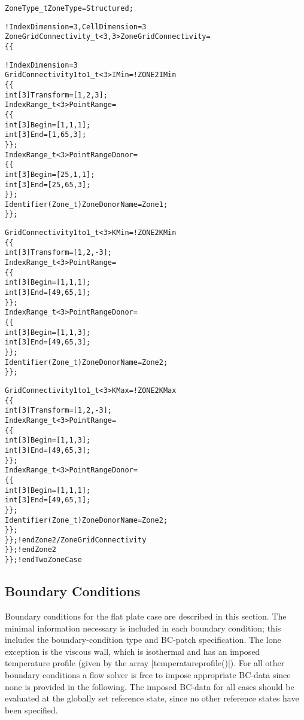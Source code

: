 \begin{alltt}
    ZoneType\_t ZoneType = Structured;

    !  IndexDimension = 3, CellDimension = 3
    ZoneGridConnectivity\_t<3,3> ZoneGridConnectivity =
      \{\{
 
     !  IndexDimension = 3
      GridConnectivity1to1\_t<3> IMin =                ! ZONE 2 IMin
        \{\{
        int[3] Transform = [1,2,3] ;
        IndexRange\_t<3> PointRange =
          \{\{
          int[3] Begin = [1,1 ,1] ;
          int[3] End   = [1,65,3] ;
          \}\} ;
        IndexRange\_t<3> PointRangeDonor =
          \{\{
          int[3] Begin = [25,1 ,1] ;
          int[3] End   = [25,65,3] ;
          \}\} ;
        Identifier(Zone\_t) ZoneDonorName = Zone1 ;
        \}\} ;

      GridConnectivity1to1\_t<3> KMin =                ! ZONE 2 KMin 
        \{\{
        int[3] Transform = [1,2,-3] ;
        IndexRange\_t<3> PointRange =
          \{\{
          int[3] Begin = [1 ,1 ,1] ;
          int[3] End   = [49,65,1] ;
          \}\} ;
        IndexRange\_t<3> PointRangeDonor =
          \{\{
          int[3] Begin = [1 ,1 ,3] ;
          int[3] End   = [49,65,3] ;
          \}\} ;
        Identifier(Zone\_t) ZoneDonorName = Zone2 ;
        \}\} ;

      GridConnectivity1to1\_t<3> KMax =                ! ZONE 2 KMax 
        \{\{
        int[3] Transform = [1,2,-3] ;
        IndexRange\_t<3> PointRange =
          \{\{
          int[3] Begin = [1 ,1 ,3] ;
          int[3] End   = [49,65,3] ;
          \}\} ;
        IndexRange\_t<3> PointRangeDonor =
          \{\{
          int[3] Begin = [1 ,1 ,1] ;
          int[3] End   = [49,65,1] ;
          \}\} ;
        Identifier(Zone\_t) ZoneDonorName = Zone2 ;
        \}\} ;
      \}\} ;      ! end Zone2/ZoneGridConnectivity
    \}\} ;        ! end Zone2
  \}\} ;          ! end TwoZoneCase
\end{alltt}

\subsection{Boundary Conditions}

Boundary conditions for the flat plate case are described in this
section.  The minimal information necessary is included in each boundary
condition; this includes the boundary-condition type and BC-patch
specification.  The lone exception is the viscous wall, which is
isothermal and has an imposed temperature profile (given by the array
|temperatureprofile()|).  For all other boundary conditions a flow
solver is free to impose appropriate BC-data since none is provided in
the following.  The imposed BC-data for all cases should be evaluated at
the globally set reference state, since no other reference states have
been specified.

